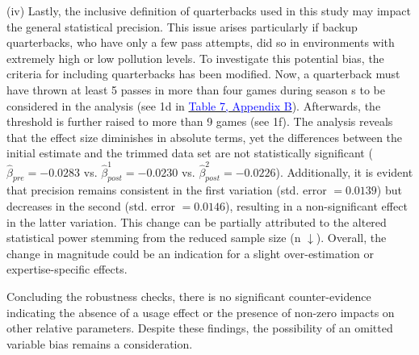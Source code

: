 \documentclass[12pt,a4paper]{article}
\newcommand{\mylink}[2]{\hyperref[#1]{\textcolor{blue}{#2}}}
\begin{document}
{(iv) Lastly, the inclusive definition of quarterbacks used in this study may impact the general statistical precision. This issue arises particularly if backup quarterbacks, who have only a few pass attempts, did so in environments with extremely high or low pollution levels. To investigate this potential bias, the criteria for including quarterbacks has been modified. Now, a quarterback must have thrown at least 5 passes in more than four games during season  s to be considered in the analysis (see 1d in \mylink{A:T3}{Table 7, Appendix B}). Afterwards, the threshold is further raised to more than 9 games (see 1f).  The analysis reveals that the effect size diminishes in absolute terms, yet the differences between the initial estimate and the trimmed data set are not statistically significant ($\hat{\beta}_{pre} = -0.0283$ vs. $\hat{\beta}^{1}_{post} = -0.0230$ vs. $\hat{\beta}^{2}_{post} = -0.0226$). Additionally, it is evident that precision remains consistent in the first variation (std. error $ = 0.0139$) but decreases in the second (std. error $ = 0.0146$), resulting in a non-significant effect in the latter variation. This change can be partially attributed to the altered statistical power stemming from the reduced sample size (n $\downarrow$). Overall, the change in magnitude could be an indication for a slight over-estimation or expertise-specific effects.


Concluding the robustness checks, there is no significant counter-evidence indicating the absence of a usage effect or the presence of non-zero impacts on other relative parameters. Despite these findings, the possibility of an omitted variable bias remains a consideration.
\clearpage
}
\end{document}
